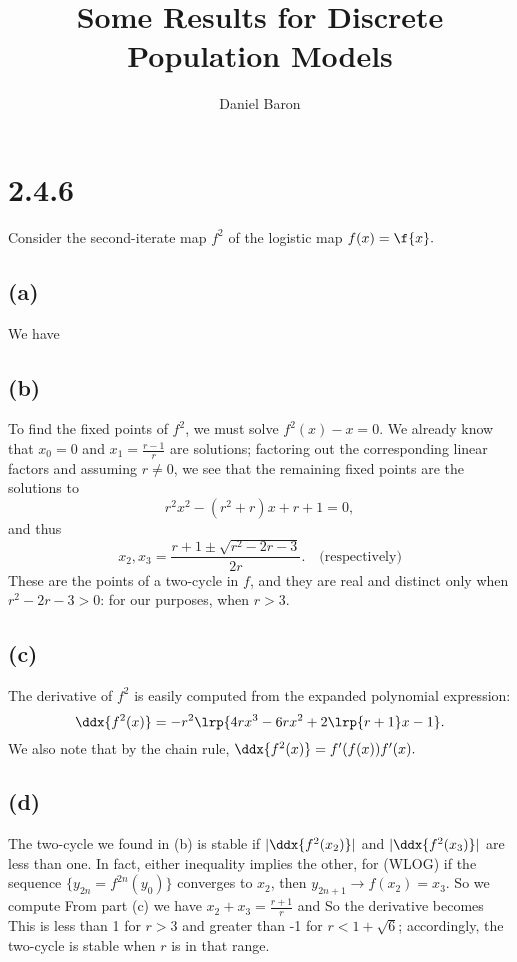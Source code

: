 \documentclass{article}
\title{Some Results for Discrete Population Models}
\author{Daniel Baron}
\begin{document}
\maketitle

\section{2.4.6}
Consider the second-iterate map $f^2$ of the logistic map $f(x)=\f{x}.$ 

\subsection*{(a)} We have

\subsection*{(b)} To find the fixed points of $f^2$, we must solve $f^2(x)-x=0$. We already know that $x_0=0$ and $x_1=\frac{r-1}{r}$ are solutions; factoring out the corresponding linear factors and assuming $r\neq0$, we see that the remaining fixed points are the solutions to
$$
r^2x^2-(r^2+r)x+r+1=0,$$
and thus
$$x_2,x_3=\frac{r+1\pm\sqrt{r^2-2r-3}}{2r}.
\quad\text{(respectively)}$$
These are the points of a two-cycle in $f$, and they are real and distinct only when $r^2-2r-3>0$: for our purposes, when $r>3$.

\subsection*{(c)} The derivative of $f^2$ is easily computed from the expanded polynomial expression:
$$\ddx{f^2(x)}=-r^2\lrp{4rx^3-6rx^2+2\lrp{r+1}x-1}.$$
We also note that by the chain rule, $\ddx{f^2(x)}=f'(f(x))f'(x).$ 

\subsection*{(d)}The two-cycle we found in (b) is stable if $|\ddx{f^2(x_2)}|$ and $|\ddx{f^2(x_3)}|$ are less than one. In fact, either inequality implies the other, for (WLOG) if the sequence $\{y_{2n}=f^{2n}(y_0)\}$ converges to $x_2$, then $y_{2n+1}\to f(x_2)=x_3$. So we compute
From part (c) we have $x_2+x_3={\frac{r+1}{r}}$ and
So the derivative becomes
This is less than 1 for $r>3$ and greater than -1 for $r<1+\sqrt6$; accordingly, the two-cycle is stable when $r$ is in that range. 
\end{document}
